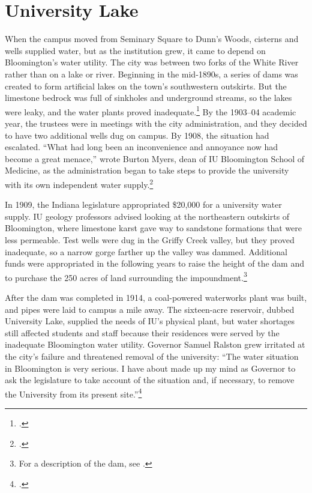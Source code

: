 \documentclass[
  american,
  letterpaper,
]{scrreprt}
\begin{document}
\section{University Lake}\label{university-lake}

When the campus moved from Seminary Square to Dunn's Woods, cisterns and
wells supplied water, but as the institution grew, it came to depend on
Bloomington's water utility. The city was between two forks of the White
River rather than on a lake or river. Beginning in the mid-1890s, a
series of dams was created to form artificial lakes on the town's
southwestern outskirts. But the limestone bedrock was full of sinkholes
and underground streams, so the lakes were leaky, and the water plants
proved inadequate.\footnote{.} By the 1903--04 academic year, the trustees were in
meetings with the city administration, and they decided to have two
additional wells dug on campus. By 1908, the situation had escalated.
``What had long been an inconvenience and annoyance now had become a
great menace,'' wrote Burton Myers, dean of IU Bloomington School of
Medicine, as the administration began to take steps to provide the
university with its own independent water supply.\footnote{.}

In 1909, the Indiana legislature appropriated \$20,000 for a university
water supply. IU geology professors advised looking at the northeastern
outskirts of Bloomington, where limestone karst gave way to sandstone
formations that were less permeable. Test wells were dug in the Griffy
Creek valley, but they proved inadequate, so a narrow gorge farther up
the valley was dammed. Additional funds were appropriated in the
following years to raise the height of the dam and to purchase the 250
acres of land surrounding the impoundment.\footnote{For a description of
  the dam, see .}

After the dam was completed in 1914, a coal-powered waterworks plant was
built, and pipes were laid to campus a mile away. The sixteen-acre
reservoir, dubbed University Lake, supplied the needs of IU's physical
plant, but water shortages still affected students and staff because
their residences were served by the inadequate Bloomington water
utility. Governor Samuel Ralston grew irritated at the city's failure
and threatened removal of the university: ``The water situation in
Bloomington is very serious. I have about made up my mind as Governor to
ask the legislature to take account of the situation and, if necessary,
to remove the University from its present site.''\footnote{.}
\end{document}
